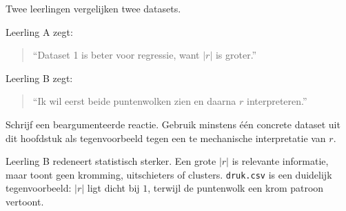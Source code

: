 \documentclass{ximera}
\begin{document}
\begin{oefening}{\oefG}

Twee leerlingen vergelijken twee datasets.

Leerling A zegt:
\begin{quote}
``Dataset 1 is beter voor regressie, want $|r|$ is groter.''
\end{quote}

Leerling B zegt:
\begin{quote}
``Ik wil eerst beide puntenwolken zien en daarna $r$ interpreteren.''
\end{quote}

Schrijf een beargumenteerde reactie. Gebruik minstens één concrete
dataset uit dit hoofdstuk als tegenvoorbeeld tegen een te mechanische
interpretatie van $r$.

\begin{oplossing}
Leerling B redeneert statistisch sterker. Een grote $|r|$ is relevante
informatie, maar toont geen kromming, uitschieters of clusters.
\texttt{druk.csv} is een duidelijk tegenvoorbeeld: $|r|$ ligt dicht
bij $1$, terwijl de puntenwolk een krom patroon vertoont.
\end{oplossing}

\end{oefening}
\end{document}
